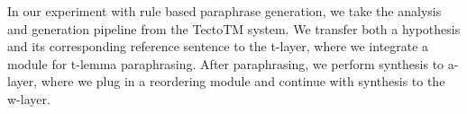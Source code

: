 In our experiment with rule based paraphrase generation, we take the analysis and generation pipeline from the TectoTM system. 
We transfer both a hypothesis and its corresponding reference sentence to the t-layer, where we integrate a module for t-lemma paraphrasing. 
After paraphrasing, we perform synthesis to a-layer, where we plug in a reordering module and continue with synthesis to the w-layer.
